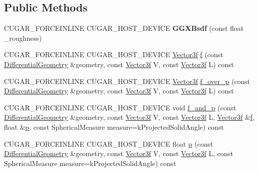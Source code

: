 \subsection*{Public Methods}
\begin{DoxyCompactItemize}
\item 
\mbox{\label{structcugar_1_1_g_g_x_bsdf_a5c7ea712c71a03c53ac3e60f1579748c}} 
C\+U\+G\+A\+R\+\_\+\+F\+O\+R\+C\+E\+I\+N\+L\+I\+NE C\+U\+G\+A\+R\+\_\+\+H\+O\+S\+T\+\_\+\+D\+E\+V\+I\+CE {\bfseries G\+G\+X\+Bsdf} (const float \+\_\+roughness)
\item 
C\+U\+G\+A\+R\+\_\+\+F\+O\+R\+C\+E\+I\+N\+L\+I\+NE C\+U\+G\+A\+R\+\_\+\+H\+O\+S\+T\+\_\+\+D\+E\+V\+I\+CE \hyperlink{structcugar_1_1_vector}{Vector3f} \hyperlink{structcugar_1_1_g_g_x_bsdf_ade42e4704bbe10ead6428c9ad0bc4bca}{f} (const \hyperlink{structcugar_1_1_differential_geometry}{Differential\+Geometry} \&geometry, const \hyperlink{structcugar_1_1_vector}{Vector3f} V, const \hyperlink{structcugar_1_1_vector}{Vector3f} L) const
\item 
C\+U\+G\+A\+R\+\_\+\+F\+O\+R\+C\+E\+I\+N\+L\+I\+NE C\+U\+G\+A\+R\+\_\+\+H\+O\+S\+T\+\_\+\+D\+E\+V\+I\+CE \hyperlink{structcugar_1_1_vector}{Vector3f} \hyperlink{structcugar_1_1_g_g_x_bsdf_a143ff030d5661b546a099a7273e569d3}{f\+\_\+over\+\_\+p} (const \hyperlink{structcugar_1_1_differential_geometry}{Differential\+Geometry} \&geometry, const \hyperlink{structcugar_1_1_vector}{Vector3f} V, const \hyperlink{structcugar_1_1_vector}{Vector3f} L) const
\item 
C\+U\+G\+A\+R\+\_\+\+F\+O\+R\+C\+E\+I\+N\+L\+I\+NE C\+U\+G\+A\+R\+\_\+\+H\+O\+S\+T\+\_\+\+D\+E\+V\+I\+CE void \hyperlink{structcugar_1_1_g_g_x_bsdf_a19e0c339e47c732475fdff4d9830034b}{f\+\_\+and\+\_\+p} (const \hyperlink{structcugar_1_1_differential_geometry}{Differential\+Geometry} \&geometry, const \hyperlink{structcugar_1_1_vector}{Vector3f} V, const \hyperlink{structcugar_1_1_vector}{Vector3f} L, \hyperlink{structcugar_1_1_vector}{Vector3f} \&\hyperlink{structcugar_1_1_g_g_x_bsdf_ade42e4704bbe10ead6428c9ad0bc4bca}{f}, float \&\hyperlink{structcugar_1_1_g_g_x_bsdf_a47b841b65fb62b596e3c436567b9912d}{p}, const Spherical\+Measure measure=k\+Projected\+Solid\+Angle) const
\item 
C\+U\+G\+A\+R\+\_\+\+F\+O\+R\+C\+E\+I\+N\+L\+I\+NE C\+U\+G\+A\+R\+\_\+\+H\+O\+S\+T\+\_\+\+D\+E\+V\+I\+CE float \hyperlink{structcugar_1_1_g_g_x_bsdf_a47b841b65fb62b596e3c436567b9912d}{p} (const \hyperlink{structcugar_1_1_differential_geometry}{Differential\+Geometry} \&geometry, const \hyperlink{structcugar_1_1_vector}{Vector3f} V, const \hyperlink{structcugar_1_1_vector}{Vector3f} L, const Spherical\+Measure measure=k\+Projected\+Solid\+Angle) const

\end{DoxyCompactItemize}
